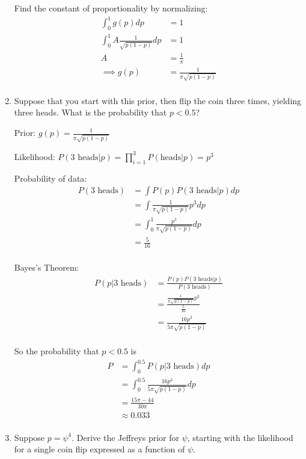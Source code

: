 \begin{enumerate}[label=\textbf{\Alph*}.]
    Find the constant of proportionality by normalizing:
    \begin{align*}
        \int_0^1 g(p)dp &= 1 \\
        \int_0^1 A \frac{1}{\sqrt{p(1-p)}} dp &= 1 \\
        A &= \frac{1}{\pi} \\
        \implies g(p) &= \frac{1}{\pi\sqrt{p(1-p)}} \\
    \end{align*}

    \item Suppose that you start with this prior, then flip the coin three times, yielding three heads. What is the probability that $p<0.5$?
    
    Prior: $g(p) = \frac{1}{\pi\sqrt{p(1-p)}}$

    Likelihood: $P(\text{3 heads}|p) = \prod_{i=1}^3 P(\text{heads}|p) = p^3$

    Probability of data:
    \begin{align*}
        P(\text{3 heads}) &= \int P(p) P(\text{3 heads}|p) dp \\
        &= \int \frac{1}{\pi\sqrt{p(1-p)}} p^3 dp \\
        &= \int_0^1 \frac{p^3}{\pi\sqrt{p(1-p)}} dp \\
        &= \frac{5}{16} \\
    \end{align*}

    Bayes's Theorem:
    \begin{align*}
        P(p|\text{3 heads}) &= \frac{P(p)P(\text{3 heads}|p)}{P(\text{3 heads})} \\
        &= \frac{\frac{1}{\pi\sqrt{p(1-p)}} p^3 }{\frac{5}{16}} \\
        &= \frac{16p^3}{5\pi\sqrt{p(1-p)}} \\
    \end{align*}

    So the probability that $p<0.5$ is
    \begin{align*}
        P &= \int_0^{0.5} P(p|\text{3 heads}) dp \\
        &= \int_0^{0.5} \frac{16p^3}{5\pi\sqrt{p(1-p)}} dp \\
        &= \frac{15\pi - 44}{30\pi} \\
        &\approx 0.033 \\
    \end{align*}

    \item Suppose $p = \psi^4$. Derive the Jeffreys prior for $\psi$, starting with the likelihood for a single coin flip expressed as a function of $\psi$.
    

\end{enumerate}
